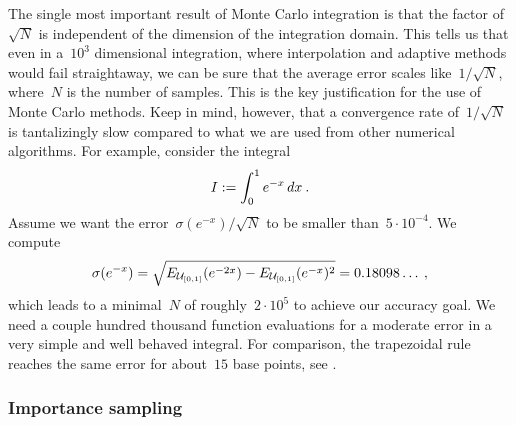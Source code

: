 The single most important result of Monte Carlo integration is that the factor
of~$\sqrt{N}$ is independent of the dimension of the integration domain. This
tells us that even in a~$10^3$ dimensional integration, where interpolation and
adaptive methods would fail straightaway, we can be sure that the average error
scales like~$1/\sqrt{N}$, where~$N$ is the number of samples. This is the key
justification for the use of Monte Carlo methods. Keep in mind, however, that a
convergence rate of~$1/\sqrt{N}$ is tantalizingly slow compared to what we are
used from other numerical algorithms. For example, consider the integral
%
\begin{equation}
  I := \int_0^1 e^{-x} \,dx\:.
\end{equation}
%
Assume we want the error~$\sigma (e^{-x}) / \sqrt{N}$ to be smaller
than~$5 \cdot 10^{-4}$. We compute
%
\begin{equation}\label{sigmaexp}
  \sigma (e^{-x}) =
    \sqrt{E_{\mathcal{U}_{[0,1]}}(e^{-2 x}) - E_{\mathcal{U}_{[0,1]}}(e^{-x})^2} =
    0.18098\ldots \:,
\end{equation}
%
which leads to a minimal~$N$ of roughly~$2\cdot10^5$ to achieve our accuracy
goal. We need a couple hundred thousand function evaluations for a moderate
error in a very simple and well behaved integral. For comparison, the
trapezoidal rule reaches the same error for about~$15$ base points, see
.

\subsubsection{Importance sampling}

